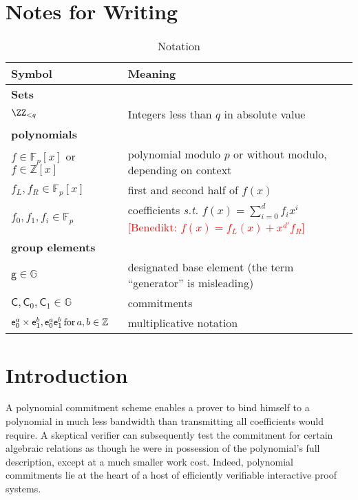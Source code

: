 \documentclass{article}
\theoremstyle{definition}
\newcommand{\benedikt}[1]{{\textcolor{red}{[Benedikt: #1]}}}
\newcommand{\benedikt}[1]{}
\begin{document}
\section*{Notes for Writing}
\begin{table}
    \caption{Notation}
    \label{tab:notation}
    \centering
    \begin{tabular}{l|l}
        Symbol & Meaning   \\ \hline \hline
        {\bf Sets} & \\ \hline
        $\ZZ_{< q}$ & Integers less than $q$ in absolute value\\
        \hline
        {\bf polynomials} & \\ \hline
        $f \in \mathbb{F}_p[x]$ or $f \in \mathbb{Z}[x]$ & polynomial modulo $p$ or without modulo, depending on context \\
        $f_L, f_R \in \mathbb{F}_p[x]$ & first and second half of $f(x)$ \\
        $f_0, f_1, f_i \in \mathbb{F}_p$ & coefficients \emph{s.t.} $f(x) = \sum_{i=0}^d f_ix^i$ \benedikt{$f(x)=f_L(x)+x^{d'} f_R$} \\ \hline
        {\bf group elements} &  \\ \hline
        $\mathsf{g} \in \mathbb{G}$ & designated base element (the term ``generator'' is misleading) \\ 
        $\mathsf{C}, \mathsf{C}_0, \mathsf{C}_1 \in \mathbb{G}$ & commitments \\
        $\mathsf{e}_0^a \times \mathsf{e}_1^b, \mathsf{e}_0^a\mathsf{e}_1^b \, \textnormal{for} \, a, b \in \mathbb{Z}$ & multiplicative notation \\ 
    \end{tabular}
\end{table}

\section{Introduction}

A polynomial commitment scheme enables a prover to bind himself to a polynomial in much less bandwidth than transmitting all coefficients would require. A skeptical verifier can subsequently test the commitment for certain algebraic relations as though he were in possession of the polynomial's full description, except at a much smaller work cost. Indeed, polynomial commitments lie at the heart of a host of efficiently verifiable interactive proof systems.
\end{document}
